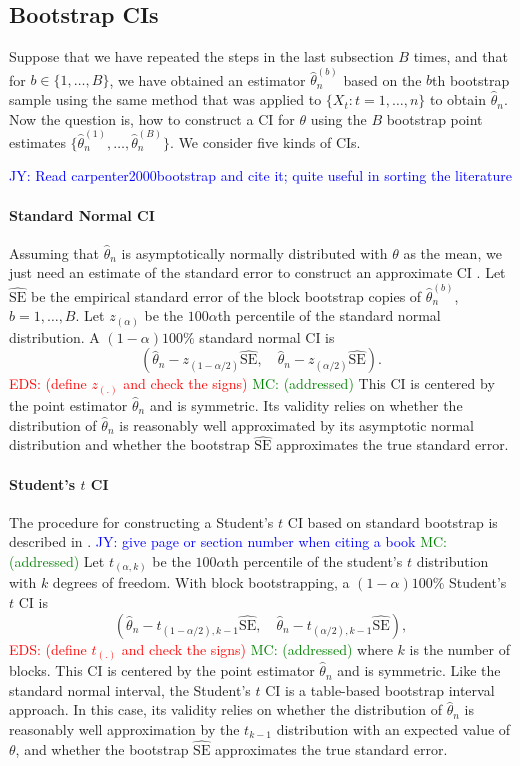 \documentclass[12pt, letterpaper, titlepage]{article}
\newcommand{\jy}[1]{\textcolor{blue}{JY: #1}}
\newcommand{\eds}[1]{\textcolor{red}{EDS: (#1)}}
\newcommand{\mc}[1]{\textcolor{green}{MC: (#1)}}
\begin{document}
\subsection{Bootstrap CIs}

Suppose that we have repeated the steps in the last subsection $B$ times, and
that for $b \in \{1, \ldots, B\}$, we have obtained an estimator
$\hat\theta_n^{(b)}$ based on the $b$th bootstrap sample using the same method
that was applied to $\{X_t: t = 1, \ldots, n\}$ to obtain $\hat\theta_n$.
Now the question is, how to construct a CI for $\theta$
using the $B$ bootstrap point estimates
$\{\hat\theta_n^{(1)}, \ldots, \hat\theta_n^{(B)}\}$.
We consider five kinds of CIs.

\jy{Read carpenter2000bootstrap and cite it; quite useful in sorting the literature}

\paragraph{Standard Normal CI}
Assuming that $\hat\theta_n$ is asymptotically normally distributed with
$\theta$ as the mean, we just need an estimate of the standard error to
construct an approximate CI \citep[p.168]{efron1993introduction}.
Let $\widehat{\text{SE}}$ be the empirical standard error of the block bootstrap
copies of $\hat\theta_n^{(b)}$, $b = 1, \ldots, B$. Let $z_{(\alpha)}$ be the $100\alpha$th percentile of the standard normal distribution.
A $(1 - \alpha)100\%$ standard normal CI is
\[
(\hat{\theta}_{n} - z_{(1-\alpha/2)}\widehat{\text{SE}}, \quad
\hat{\theta}_{n} - z_{(\alpha/2)}\widehat{\text{SE}}).
\]
\eds{define $z_{(.)}$ and check the signs} \mc{addressed}
This CI is centered by the point estimator $\hat\theta_n$ and is symmetric.
Its validity relies on whether the distribution of $\hat\theta_n$ is reasonably
well approximated by its asymptotic normal distribution and whether the
bootstrap $\widehat{\text{SE}}$ approximates the true standard error.

\paragraph{Student's $t$ CI}
The procedure for constructing a Student's $t$ CI based on standard bootstrap is
described in \citet[p.158]{efron1993introduction}. \jy{give page or section number when
  citing a book} \mc{addressed} Let $t_{(\alpha, k)}$ be the $100\alpha$th percentile of the student's $t$ distribution with $k$ degrees of freedom.
With block bootstrapping, a $(1 - \alpha)100\%$ Student's $t$ CI is
\[
(\hat{\theta}_{n} - t_{(1-\alpha/2), k - 1}\hat{\text{SE}}, \quad
\hat{\theta}_{n} - t_{(\alpha/2), k -1}\hat{\text{SE}}),
\]
\eds{define $t_{(.)}$ and check the signs}  \mc{addressed}
where $k$ is the number of blocks.
This CI is centered by the point estimator $\hat\theta_n$ and is symmetric.
Like the standard 
normal interval, the Student's $t$ CI is a table-based bootstrap interval
approach. In this case,
its validity relies on whether the distribution of $\hat\theta_n$ is
reasonably well approximation by the $t_{k-1}$ distribution with an
expected value of $\theta$, and whether the bootstrap 
$\widehat{\text{SE}}$ approximates the true standard error.
\end{document}
